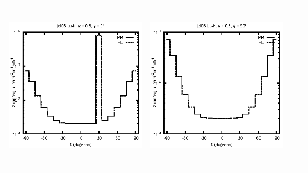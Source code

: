 \begin{tabular}{c c c c}
\includegraphics[height=7cm]{../eps/jol06_Lu_ir_fwd.eps} &
\includegraphics[height=7cm]{../eps/jol06_Lu_ir_cross.eps} \\
\end{tabular}

\pagebreak

